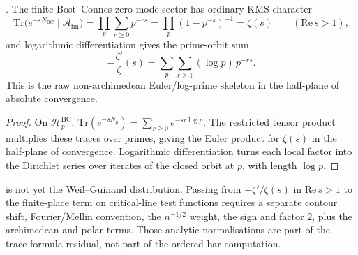 \begin{proposition}
\label{v4-arith:3d-acs:prop:deninger-prime-side}
\ClaimStatusProvedHere. The finite Bost--Connes zero-mode sector has
ordinary KMS character
\[
\mathrm{Tr}\bigl(e^{-sN_{\mathrm{BC}}}\mid\mathcal A_{\mathrm{fin}}\bigr)
=\prod_{p}\sum_{r\geq0}p^{-rs}
=\prod_{p}(1-p^{-s})^{-1}
=\zeta(s)
\qquad(\mathrm{Re}\,s>1),
\]
and logarithmic differentiation gives the prime-orbit sum
\[
-\frac{\zeta'}{\zeta}(s)
=\sum_{p}\sum_{r\geq1}(\log p)\,p^{-rs}.
\]
This is the raw non-archimedean Euler/log-prime skeleton in the
half-plane of absolute convergence.
\end{proposition}

\begin{proof}
On \(\mathcal H_{p}^{\mathrm{BC}}\),
\(\mathrm{Tr}(e^{-sN_{p}})=\sum_{r\geq0}e^{-sr\log p}\). The
restricted tensor product multiplies these traces over primes, giving
the Euler product for \(\zeta(s)\) in the half-plane of convergence.
Logarithmic differentiation turns each local factor into the Dirichlet
series over iterates of the closed orbit at \(p\), with length
\(\log p\).
\end{proof}

\begin{remark}
\label{v4-arith:3d-acs:rem:euler-skeleton-not-trace}
 is not yet the
Weil--Guinand distribution. Passing from
\(-\zeta'/\zeta(s)\) in \(\mathrm{Re}\,s>1\) to the finite-place term
on critical-line test functions requires a separate contour shift,
Fourier/Mellin convention, the \(n^{-1/2}\) weight, the sign and factor
\(2\), plus the archimedean and polar terms. Those analytic
normalisations are part of the trace-formula residual, not part of the
ordered-bar computation.
\end{remark}

